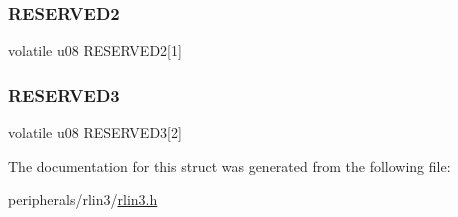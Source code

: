 \mbox{\label{structrlin3_af1fbc9182e34aa65f0de1bd52f869c11}} 
\subsubsection{\texorpdfstring{R\+E\+S\+E\+R\+V\+E\+D2}{RESERVED2}}
{\footnotesize\ttfamily volatile u08 R\+E\+S\+E\+R\+V\+E\+D2\mbox{[}1\mbox{]}}

\mbox{\label{structrlin3_a1d31693daba1fa42088b549d16f8a9de}} 
\subsubsection{\texorpdfstring{R\+E\+S\+E\+R\+V\+E\+D3}{RESERVED3}}
{\footnotesize\ttfamily volatile u08 R\+E\+S\+E\+R\+V\+E\+D3\mbox{[}2\mbox{]}}



The documentation for this struct was generated from the following file\+:\begin{DoxyCompactItemize}
\item 
peripherals/rlin3/\mbox{\hyperlink{rlin3_8h}{rlin3.\+h}}\end{DoxyCompactItemize}
